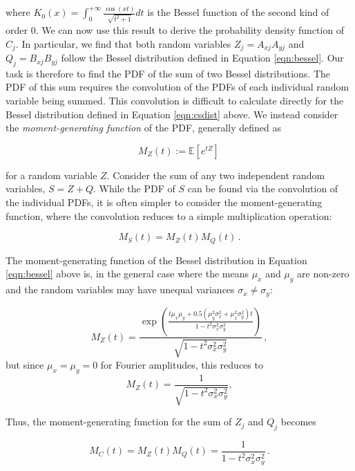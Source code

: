 \documentclass[12pt]{emulateapj}
\begin{document}
\noindent where $K_0(x) = \int_{0}^{+\infty}{\frac{\cos{(xt)}}{\sqrt{t^2 + 1}} dt}$ is the Bessel function of the second kind of order $0$. We can now use this result to derive the probability density function of $C_j$. In particular, we find that both random variables $Z_j = A_{xj} A_{yj}$ and $Q_j = B_{xj} B_{yj}$ follow the Bessel distribution defined in Equation \ref{eqn:bessel}. Our task is therefore to find the PDF of the sum of two Bessel distributions. The PDF of this sum requires the convolution of the PDFs of each individual random variable being summed. This convolution is difficult to calculate directly for the Bessel distribution defined in Equation \ref{eqn:csdist} above. We instead consider the \textit{moment-generating function} of the PDF, generally defined as 

\begin{equation}
M_Z(t) := \mathbb{E}[e^{tZ}] \, 
\end{equation}

\noindent for a random variable $Z$. Consider the sum of any two independent random variables, $S = Z + Q$. While the PDF of $S$ can be found via the convolution of the individual PDFs, it is often simpler to consider the moment-generating function, where the convolution reduces to a simple multiplication operation:

\begin{equation}
M_S(t) = M_Z(t) M_Q(t) \, .
\end{equation} 

\noindent The moment-generating function of the Bessel distribution in Equation \ref{eqn:bessel} above is, in the general case \citep{seijas2012} where the means $\mu_x$ and $\mu_y$ are non-zero and the random variables may have unequal variances $\sigma_x \neq \sigma_y$: 

\begin{equation}
M_Z(t) = \frac{\exp{\left( \frac{t\mu_x \mu_y + 0.5 (\mu_y^2 \sigma_x^2 + \mu_x^2 \sigma_y^2) t}{1 - t^2 \sigma_x^2 \sigma_y^2} \right)}}{\sqrt{1 - t^2 \sigma_x^2 \sigma_y^2}}\, ,
\end{equation}
but since $\mu_x = \mu_y = 0$ for Fourier amplitudes, this reduces to
\begin{equation}
M_Z(t) =  \frac{1}{\sqrt{1 - t^2 \sigma_x^2 \sigma_y^2}}  \label{eqn:mgf},
\end{equation}

Thus, the moment-generating function for the sum of $Z_j$ and $Q_j$ becomes

\begin{equation}
M_C(t) = M_Z(t) M_Q(t) = \frac{1}{1 - t^2 \sigma_x^2 \sigma_y^2} \, .
\label{eqn:mgt_c}
\end{equation}
\end{document}
